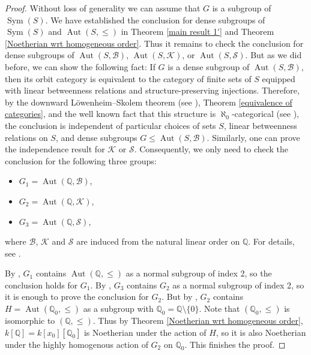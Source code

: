 \documentclass[11pt, reqno]{amsart}
\theoremstyle{plain}
\numberwithin{equation}{section}
\theoremstyle{definition}
\DeclareMathOperator{\Aut}{Aut}
\DeclareMathOperator{\Sym}{Sym}
\begin{document}
\begin{proof}
Without loss of generality we can assume that $G$ is a subgroup of $\Sym(S)$. We have established the conclusion for dense subgroups of $\Sym(S)$ and $\Aut(S, \leqslant)$ in Theorem \ref{main result 1'} and Theorem \ref{Noetherian wrt homogeneous order}. Thus it remains to check the conclusion for dense subgroups of $\Aut(S, \mathcal{B})$, $\Aut(S, \mathcal{K})$, or $\Aut(S, \mathcal{S})$. But as we did before, we can show the following fact: If $G$ is a dense subgroup of $\Aut(S, \mathcal{B})$, then its orbit category is equivalent to the category of finite sets of $S$ equipped with linear betweenness relations  and structure-preserving injections. Therefore, by the downward L\"{o}wenheim–Skolem theorem (see \cite[Section 2.3]{Marker}), Theorem \ref{equivalence of categories}, and the well known fact that this structure is $\aleph_0$-categorical (see \cite[Section 2.5, (2.10)]{Ca}), the conclusion is independent of particular choices of sets $S$, linear betweenness relations on $S$, and dense subgroups $G \leqslant \Aut(S, \mathcal{B})$. Similarly, one can prove the independence result for $\mathcal{K}$ or $\mathcal{S}$. Consequently, we only need to check the conclusion for the following three groups:
\begin{itemize}
\item $G_1 = \Aut(\mathbb{Q}, \mathcal{B})$,
\item $G_2 = \Aut(\mathbb{Q}, \mathcal{K})$,
\item $G_3 = \Aut(\mathbb{Q}, \mathcal{S})$,
\end{itemize}
where $\mathcal{B}$, $\mathcal{K}$ and $\mathcal{S}$ are induced from the natural linear order on $\mathbb{Q}$. For details, see \cite[Section 11.3]{BMMN}.

By \cite[Theorems 11.7]{BMMN}, $G_1$ contains $\Aut(\mathbb{Q}, \leqslant)$ as a normal subgroup of index 2, so the conclusion holds for $G_1$. By \cite[Theorem 11.11]{BMMN}, $G_3$ contains $G_2$ as a normal subgroup of index 2, so it is enough to prove the conclusion for $G_2$. But by \cite[Theorem 11.9]{BMMN}, $G_2$ contains $H = \Aut(\mathbb{Q}_0, \leqslant)$ as a subgroup with $\mathbb{Q}_0 = \mathbb{Q} \setminus \{0 \}$. Note that $(\mathbb{Q}_0, \leqslant)$ is isomorphic to $(\mathbb{Q}, \leqslant)$. Thus by Theorem \ref{Noetherian wrt homogeneous order}, $k[\mathbb{Q}] = k[x_0][\mathbb{Q}_0]$ is Noetherian under the action of $H$, so it is also Noetherian under the highly homogenous action of $G_2$ on $\mathbb{Q}_0$. This finishes the proof.
\end{proof}
\end{document}
